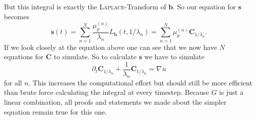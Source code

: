 \documentclass[12pt,a4paper,twoside, open=right]{scrreprt}
\theoremstyle{definition}
\theoremstyle{plain}
\newcommand{\bfb}{\bm{b}}
\newcommand{\bfs}{\bm{s}}
\newcommand{\bfC}{\bm{C}}
\begin{document}
But this integral is exactly the \textsc{Laplace}-Transform of $\bfb$. So our equation for $\bfs$ becomes
\begin{equation}
    \bfs(t)=\sum_{n=1}^N\frac{\mu_p^{(n)}}{\lambda_n}L_{\bfb}(t,1/\lambda_n)=\sum_{n=1}^N\mu_p^{(n)}\bfC_{1/\lambda_n}.
\end{equation}
If we look closely at the equation above one can see that we now have $N$ equations for $\bfC$ to simulate. So to calculate $\bfs$ we have to simulate 
\begin{equation}
    \partial_t \bfC_{1/\lambda_n}+\frac{1}{\lambda_n}\bfC_{1/\lambda_n}=\nabla u
\end{equation}
for all $n$. This increases the computational effort but should still be more efficient than brute force calculating the integral at every timestep. Because $G$ is just a linear combination, all proofs and statements we made about the simpler equation remain true for this one.
\end{document}
